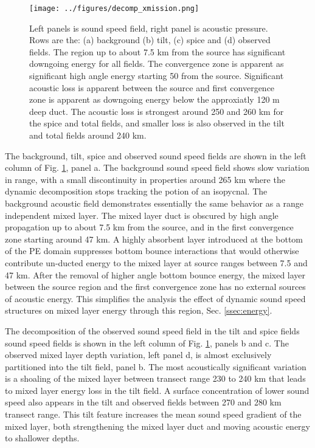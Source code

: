 \documentclass[preprint,NumberedRefs]{JASA}
\begin{document}
\begin{figure}
\texttt{[image: ../figures/decomp\_xmission.png]}
    \caption{\label{fig:decomp_x}{Left panels is sound speed field, right panel is acoustic pressure. Rows are the: (a) background (b) tilt, (c) spice and (d) observed fields. The region up to about 7.5 km from the source has significant downgoing energy for all fields. The convergence zone is apparent as significant high angle energy starting 50 from the source. Significant acoustic loss is apparent between the source and first convergence zone is apparent as downgoing energy below the approxiatly 120 m deep duct. The acoustic loss is strongest around 250 and 260 km for the spice and total fields, and smaller loss is also observed in the tilt and total fields around 240 km.}}
\end{figure}

The background, tilt, spice and observed sound speed fields are shown in the left column of Fig. \ref{fig:decomp_x}, panel a. The background sound speed field shows slow variation in range, with a small discontinuity in properties around 265 km where the dynamic decomposition stops tracking the potion of an isopycnal. The background acoustic field demonstrates essentially the same behavior as a range independent mixed layer. The mixed layer duct is obscured by high angle propagation up to about 7.5 km from the source, and in the first convergence zone starting around 47 km. A highly absorbent layer introduced at the bottom of the PE domain suppresses bottom bounce interactions that would otherwise contribute un-ducted energy to the mixed layer at source ranges between 7.5 and 47 km. After the removal of higher angle bottom bounce energy, the mixed layer between the source region and the first convergence zone has no external sources of acoustic energy. This simplifies the analysis the effect of dynamic sound speed structures on mixed layer energy through this region, Sec. \ref{ssec:energy}.

The decomposition of the observed sound speed field in the tilt and spice fields sound speed fields is shown in the left column of Fig. \ref{fig:decomp_x}, panels b and c. The observed mixed layer depth variation, left panel d, is almost exclusively partitioned into the tilt field, panel b. The most acoustically significant variation is a shoaling of the mixed layer between transect range 230 to 240 km that leads to mixed layer energy loss in the tilt field. A surface concentration of lower sound speed also appears in the tilt and observed fields between 270 and 280 km transect range. This tilt feature increases the mean sound speed gradient of the mixed layer, both strengthening the mixed layer duct and moving acoustic energy to shallower depths.
\end{document}
